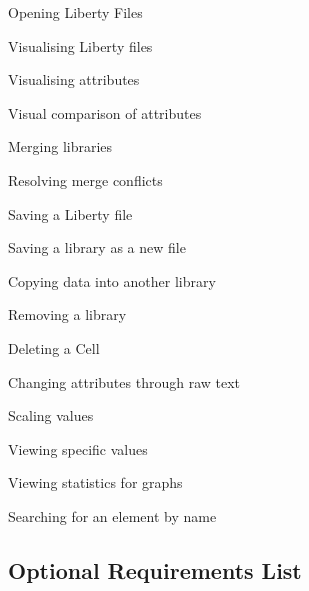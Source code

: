 \documentclass[10pt,a4paper]{report}
\begin{document}
\begin{FR}
    \item Opening Liberty Files \label{FR-1}
    \item Visualising Liberty files \label{FR-2}
    \item Visualising attributes \label{FR-3}
    \item Visual comparison of attributes \label{FR-4}
    \item Merging libraries \label{FR-5}
    \item Resolving merge conflicts \label{FR-6}
    \item Saving a Liberty file \label{FR-7}
    \item Saving a library as a new file \label{FR-8}
    \item Copying data into another library \label{FR-9}
    \item Removing a library \label{FR-10}
    \item Deleting a Cell \label{FR-11}
    \item Changing attributes through raw text \label{FR-12}
    \item Scaling values \label{FR-13}
    \item Viewing specific values \label{FR-14}
    \item Viewing statistics for graphs \label{FR-15}
    \item Searching for an element by name \label{FR-16}
\end{FR}
\subsection{Optional Requirements List}
\end{document}
